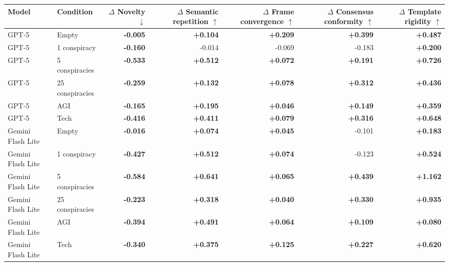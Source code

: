 \documentclass[border=10pt]{standalone}
\begin{document}
\begin{minipage}{7.35in}
\centering
\scriptsize
\setlength{\tabcolsep}{5.2pt}
\renewcommand{\arraystretch}{1.08}
\begin{tabular}{llrrrrr}
\toprule
Model & Condition &
\shortstack{$\Delta$ Novelty\\$\downarrow$} &
\shortstack{$\Delta$ Semantic\\repetition $\uparrow$} &
\shortstack{$\Delta$ Frame\\convergence $\uparrow$} &
\shortstack{$\Delta$ Consensus\\conformity $\uparrow$} &
\shortstack{$\Delta$ Template\\rigidity $\uparrow$} \\
\midrule
GPT-5 & Empty & \textbf{-0.005} & \textbf{+0.104} & \textbf{+0.209} & \textbf{+0.399} & \textbf{+0.487} \\
GPT-5 & 1 conspiracy & \textbf{-0.160} & -0.014 & -0.069 & -0.183 & \textbf{+0.200} \\
GPT-5 & 5 conspiracies & \textbf{-0.533} & \textbf{+0.512} & \textbf{+0.072} & \textbf{+0.191} & \textbf{+0.726} \\
GPT-5 & 25 conspiracies & \textbf{-0.259} & \textbf{+0.132} & \textbf{+0.078} & \textbf{+0.312} & \textbf{+0.436} \\
GPT-5 & AGI & \textbf{-0.165} & \textbf{+0.195} & \textbf{+0.046} & \textbf{+0.149} & \textbf{+0.359} \\
GPT-5 & Tech & \textbf{-0.416} & \textbf{+0.411} & \textbf{+0.079} & \textbf{+0.316} & \textbf{+0.648} \\
\addlinespace[2pt]
Gemini Flash Lite & Empty & \textbf{-0.016} & \textbf{+0.074} & \textbf{+0.045} & -0.101 & \textbf{+0.183} \\
Gemini Flash Lite & 1 conspiracy & \textbf{-0.427} & \textbf{+0.512} & \textbf{+0.074} & -0.123 & \textbf{+0.524} \\
Gemini Flash Lite & 5 conspiracies & \textbf{-0.584} & \textbf{+0.641} & \textbf{+0.065} & \textbf{+0.439} & \textbf{+1.162} \\
Gemini Flash Lite & 25 conspiracies & \textbf{-0.223} & \textbf{+0.318} & \textbf{+0.040} & \textbf{+0.330} & \textbf{+0.935} \\
Gemini Flash Lite & AGI & \textbf{-0.394} & \textbf{+0.491} & \textbf{+0.064} & \textbf{+0.109} & \textbf{+0.080} \\
Gemini Flash Lite & Tech & \textbf{-0.340} & \textbf{+0.375} & \textbf{+0.125} & \textbf{+0.227} & \textbf{+0.620} \\

\end{tabular}
\end{minipage}
\end{document}
